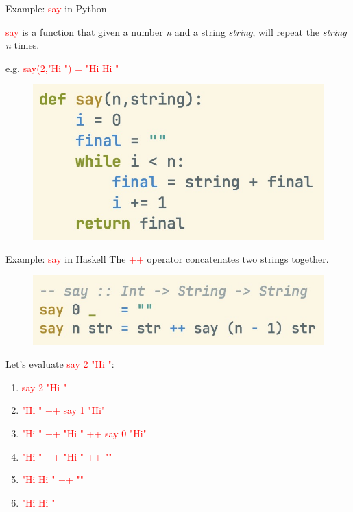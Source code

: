 \documentclass[pdf]{beamer}
\newcommand{\code}[1]{\textcolor{Red}{\textsf{#1}}}
\begin{document}
\begin{frame}{Example: \code{say} in Python}

  \code{say} is a function that given a number \textit{n} and a string \textit{string}, will repeat the \textit{string} \textit{n} times.

  e.g. \code{say(2,"Hi ") = "Hi Hi "}

  \begin{figure}[H]
    \centering
    \includegraphics[width=\linewidth]{say-py}
  \end{figure}

\end{frame}

\begin{frame}{Example: \code{say} in Haskell}
  The \code{++} operator concatenates two strings together.

  \begin{figure}[H]
    \centering
    \includegraphics[width=\linewidth]{say-hs}
  \end{figure}

  \pause
  Let's evaluate \code{say 2 "Hi "}:

  \begin{enumerate}
    \item<1-> \code{say 2 "Hi "}
    \item<2-> \code{"Hi " ++ say 1 "Hi"}
    \item<3-> \code{"Hi " ++ "Hi " ++ say 0 "Hi"}
    \item<4-> \code{"Hi " ++ "Hi " ++ ""}
    \item<5-> \code{"Hi Hi " ++ ""}
    \item<6-> \code{"Hi Hi "}
  \end{enumerate}

\end{frame}
\end{document}
